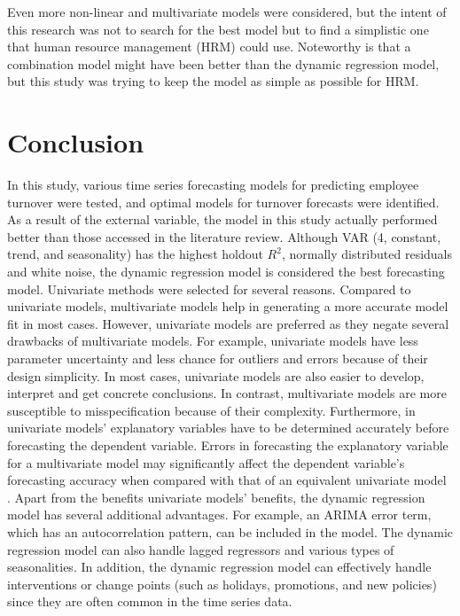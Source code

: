 Even more non-linear and multivariate models were considered, but the intent of this research was not to search for the best model but to find a simplistic one  that human resource management (HRM) could use. Noteworthy is that a combination model might have been better than the dynamic regression model, but this study was trying to keep the model  as simple as possible for HRM.
\section{Conclusion}
In this study, various time series forecasting models for predicting employee turnover were tested, and optimal models for turnover forecasts were identified. As a result of the external variable, the model in this study actually performed better than those accessed in the literature review. Although VAR (4, constant, trend, and seasonality) has the highest holdout $R^2$, normally distributed residuals and white noise, the dynamic regression model is considered the best forecasting model. Univariate methods were selected for several reasons. Compared to univariate models, multivariate models help in generating a more accurate model fit in most cases. However, univariate models are preferred as they negate several drawbacks of multivariate models. For example, univariate models have less parameter uncertainty and less chance for outliers and errors because of their design simplicity. In most cases, univariate models are also easier to develop, interpret and get concrete conclusions. In contrast, multivariate models are more susceptible to misspecification because of their complexity. Furthermore, in univariate models' explanatory variables have to be determined accurately before forecasting the dependent variable. Errors in forecasting the explanatory variable for a multivariate model may significantly affect the dependent variable's forecasting accuracy when compared with that of an equivalent univariate model \citep{chatfield2000}. Apart from the benefits univariate models' benefits, the dynamic regression model has several additional advantages. For example, an ARIMA error term, which has an autocorrelation pattern, can be included in the model. The dynamic regression model can also handle lagged regressors and various types of seasonalities. In addition, the dynamic regression model can effectively handle interventions or change points (such as holidays, promotions, and new policies) since they are often common in the time series data.  

